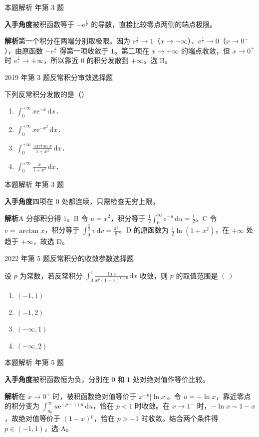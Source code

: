\documentclass[UTF8,zihao=-4,fontset=fandol]{ctexart}
\newcommand{\pickout}{\hfill（\hspace{1.4em}）}
\newenvironment{abcd}{\begin{enumerate}[label=\textup{(\Alph*)},leftmargin=2.3em,itemsep=1pt,topsep=4pt,parsep=1pt]}{\end{enumerate}}
\newcommand{\choices}[4]{%
  \begin{abcd}
    \item #1
    \item #2
    \item #3
    \item #4
  \end{abcd}}
\newcommand{\QuestionPage}[6]{%
  \par\noindent\begin{minipage}{\linewidth}
  \raggedright
  {\small\textcolor{black!60}{#3\quad #5}\hfill\textcolor{accent}{#2}}\par\smallskip}
\newcommand{\QuestionEnd}{\end{minipage}\par\medskip}
\newcommand{\QuestionPage}[6]{%
  \clearpage
  {\small\textcolor{accent}{#1\hfill #2}}\par\medskip
  {\small\textcolor{black!60}{#3\quad #5\hfill #6}}\par\vspace{9bp}}
\newcommand{\QuestionEnd}{}
\newenvironment{QuestionSolution}[1]{%
  \clearpage
  {\small\textcolor{black!60}{本题解析\quad #1}}\par\medskip
}{\par\clearpage}
\begin{document}
\begin{QuestionSolution}{2016 年第 3 题}
\textbf{入手角度}\quad 被积函数等于 \(-\mathrm{e}^{\frac{1}{x}}\) 的导数，直接比较零点两侧的端点极限。

\textbf{解析}\quad 第一个积分在两端分别取极限。因为 \(\mathrm{e}^{\frac{1}{x}}\to1\)（\(x\to-\infty\)）、\(\mathrm{e}^{\frac{1}{x}}\to0\)（\(x\to0^-\)），由原函数 \(-\mathrm{e}^{\frac{1}{x}}\) 得第一项收敛于 \(1\)。第二项在 \(x\to+\infty\) 的端点收敛，但 \(x\to0^+\) 时 \(\mathrm{e}^{\frac{1}{x}}\to+\infty\)，所以靠近 \(0\) 的积分发散到 \(+\infty\)。选 B。
\end{QuestionSolution}

\QuestionPage{3.5 反常积分}{选择题}{2019 年第 3 题}{1}{反常积分审敛}{193 / 234}
下列反常积分发散的是\pickout{}
\begin{abcd}
\item $\int_0^{+\infty} x\mathrm{e}^{- x} \,\mathrm{d} x$．
\item $\int_0^{+\infty} x\mathrm{e}^{- x^2} \,\mathrm{d} x$．
\item $\int_0^{+\infty} \frac{\arctan x}{1 + x^2}\,\mathrm{d} x$．
\item $\int_0^{+\infty} \frac{x}{1 + x^2}\,\mathrm{d} x$．
\end{abcd}
\QuestionEnd

\begin{QuestionSolution}{2019 年第 3 题}
\textbf{入手角度}\quad 四项在 \(0\) 处都连续，只需检查无穷上限。

\textbf{解析}\quad A 分部积分得 \(1\)。B 令 \(u=x^2\)，积分等于 \(\tfrac12\int_0^\infty \mathrm{e}^{-u}\,\mathrm{d}u=\frac{1}{2}\)。C 令 \(v=\arctan x\)，积分等于 \(\int_0^{\frac{\pi}{2}}v\,\mathrm{d}v=\frac{\pi^2}{8}\)。D 的原函数为 \(\tfrac12\ln(1+x^2)\)，在 \(+\infty\) 处趋于 \(+\infty\)，故选 D。
\end{QuestionSolution}

\QuestionPage{3.5 反常积分}{选择题}{2022 年第 5 题}{1}{反常积分的收敛参数}{194 / 234}
设 \(p\) 为常数，若反常积分
\(\int_{0}^{1} \frac{\ln x}{x^{p}\left( 1-x \right)^{1-p}} \,\mathrm{d}x\)
收敛，则 \(p\) 的取值范围是 \(\left( \ \right)\)
\choices{\(\left( -1,1 \right)\)}{\(\left( -1,2 \right)\)}{\(\left( -\infty,1 \right)\)}{\(\left( -\infty,2 \right)\)}
\QuestionEnd

\begin{QuestionSolution}{2022 年第 5 题}
\textbf{入手角度}\quad 被积函数恒为负，分别在 \(0\) 和 \(1\) 处对绝对值作等价比较。

\textbf{解析}\quad 在 \(x\to0^+\) 时，被积函数绝对值等价于 \(x^{-p}|\ln x|\)。令 \(u=-\ln x\)，靠近零点的积分变为 \(\int_{u_0}^{\infty}u \mathrm{e}^{(p-1)u}\,\mathrm{d}u\)，恰在 \(p<1\) 时收敛。在 \(x\to1^-\) 时，\(-\ln x\sim 1-x\)，故绝对值等价于 \((1-x)^p\)，恰在 \(p>-1\) 时收敛。结合两个条件得 \(p\in(-1,1)\)，选 A。
\end{QuestionSolution}
\end{document}
